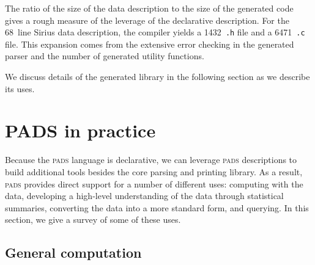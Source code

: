 \documentclass{sigplanconf}
\newcommand{\dibbler}{Sirius}
\newcommand{\pads}{\textsc{pads}}
\begin{document}
The ratio of the size of the data description to the size of the generated code gives a rough measure of the leverage of the
declarative description.  For the 
68~line \dibbler{} data description, the compiler yields a 1432~\texttt{.h} file
and a 6471~\texttt{.c} file.  This expansion comes from the extensive error checking in the generated parser and the number of generated utility functions.

We discuss details of the generated library in the following section
as we describe its uses.

\section{PADS in practice}
Because the \pads{} language is declarative, we can leverage \pads{}
descriptions to build additional tools besides the core parsing and printing
library.  As a result, \pads{} provides direct support for a number
of different uses: computing with the data, developing a high-level
understanding of the data through statistical summaries, converting the data into a more standard form, and querying.  In this section, we give a survey of some of these uses.

\subsection{General computation}
\end{document}
